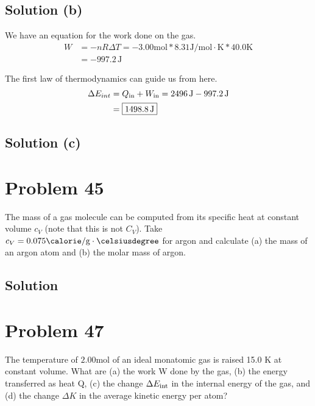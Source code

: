 \documentclass[12pt]{article}
\begin{document}
        \subsection{Solution (b)}
            We have an equation for the work done on the gas.
            \begin{align}
                W   &=  -nR\Delta T
                    =   -3.00\unit{\mole} * 8.31\unit{\joule/\mole\cdot\kelvin} * 40.0\unit{\kelvin}\\
                    &=  -997.2\,\unit{\joule}
            \end{align}

            The first law of thermodynamics can guide us from here.
            \begin{align}
                \Delta E_{int}  &=  Q_{\rm in} + W_{\rm in}
                    =   2496\,\unit{\joule} - 997.2\,\unit{\joule}\\
                    &=  \boxed{1498.8\,\unit{\joule}}
            \end{align}
        
        \subsection{Solution (c)}
            

    \pagebreak
    \section{Problem 45}
        The mass of a gas molecule can be computed from its specific heat at constant volume $c_V$ (note that this is not $C_V$). 
        Take $c_V = 0.075 \unit{\calorie/\gram\cdot\celsiusdegree}$ for argon and calculate (a) the mass of an argon atom and (b) the molar mass of argon.

        \subsection{Solution}

    \pagebreak
    \section{Problem 47}
        The temperature of $2.00 \unit{\mole}$ of an ideal monatomic gas is raised 15.0 K at constant volume. 
        What are (a) the work W done by the gas, (b) the energy transferred as heat Q, (c) the change $\Delta E_{\rm int}$ in the internal energy of the gas, and (d) the change $\Delta K$ in the average kinetic energy per atom?
\end{document}
